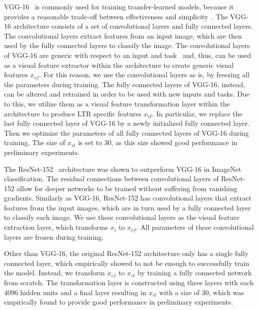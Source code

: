 
VGG-16~\cite{simonyan2014very} is commonly used for training transfer-learned models,
because it provides a reasonable trade-off between effectiveness and simplicity~\cite{shan2017two}.
The VGG-16 architecture consists of a set of convolutional layers and fully connected layers. 
The convolutional layers extract features from an input image, which are then used by the fully connected layers to classify the image. 
The convolutional layers of VGG-16 are generic with respect to an input and task~\citep{donahue2014decaf}
and, thus, can be used as a visual feature extractor within the \modelname{} architecture to create generic visual features $x_{vf}$.
For this reason, we use the convolutional layers as is, by freezing all the parameters during training.
The fully connected layers of VGG-16, instead, can be altered and retrained in order to be used with new inputs and tasks.
Due to this, we utilize them as a visual feature transformation layer within the \modelname{} architecture to produce \ac{LTR} specific features $x_{vl}$.
In particular, we replace the last fully connected layer of VGG-16 by a newly initialized fully connected layer.
Then we optimize the parameters of all fully connected layers of VGG-16 during training.
The size of $x_{vl}$ is set to $30$, as this size showed good performance in preliminary experiments.

The ResNet-152~\cite{he2016deep} architecture was shown to outperform VGG-16 in ImageNet classification.
The residual connections between convolutional layers of ResNet-152 allow for deeper networks to be trained without suffering from vanishing gradients.
Similarly as VGG-16, ResNet-152 has convolutional layers that extract features from the input images, which are in turn used by a fully connected layer to classify each image.
We use these convolutional layers as the visual feature extraction layer, which transforms $x_{i}$ to $x_{vf}$. All parameters of these convolutional layers are frozen during training.

Other than VGG-16, the original ResNet-152 architecture only has a single fully connected layer, which empirically showed to not be enough to successfully train the model.
Instead, we transform $x_{vf}$ to $x_{vl}$ by training a fully connected network from scratch.
The transformation layer is constructed using three layers with each $4096$ hidden units and a final layer resulting in $x_{vl}$ with a size of $30$, which was empirically found to provide good performance in preliminary experiments.


